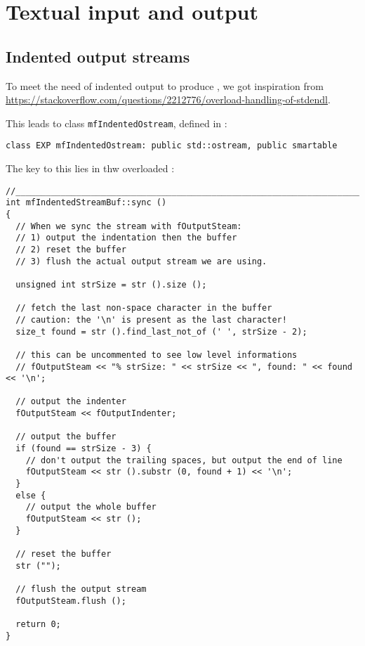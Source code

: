
\chapter{Textual input and output}



\section{Indented output streams}

To meet the need of indented output to produce , we got inspiration from \url{https://stackoverflow.com/questions/2212776/overload-handling-of-stdendl}.

This leads to class   {\tt mfIndentedOstream}, defined in :
\begin{lstlisting}[language=CPlusPlus]
class EXP mfIndentedOstream: public std::ostream, public smartable
\end{lstlisting}

The key to this lies in thw overloaded :
\begin{lstlisting}[language=CPlusPlus]
//______________________________________________________________________________
int mfIndentedStreamBuf::sync ()
{
  // When we sync the stream with fOutputSteam:
  // 1) output the indentation then the buffer
  // 2) reset the buffer
  // 3) flush the actual output stream we are using.

  unsigned int strSize = str ().size ();

  // fetch the last non-space character in the buffer
  // caution: the '\n' is present as the last character!
  size_t found = str ().find_last_not_of (' ', strSize - 2);

  // this can be uncommented to see low level informations
  // fOutputSteam << "% strSize: " << strSize << ", found: " << found << '\n';

  // output the indenter
  fOutputSteam << fOutputIndenter;

  // output the buffer
  if (found == strSize - 3) {
    // don't output the trailing spaces, but output the end of line
    fOutputSteam << str ().substr (0, found + 1) << '\n';
  }
  else {
    // output the whole buffer
    fOutputSteam << str ();
  }

  // reset the buffer
  str ("");

  // flush the output stream
  fOutputSteam.flush ();

  return 0;
}
\end{lstlisting}

